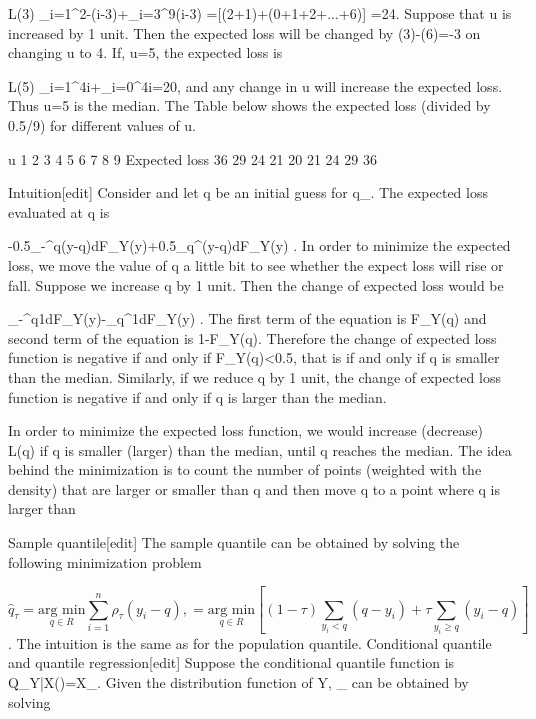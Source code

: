 L(3) \propto\sum_{i=1}^{2}-(i-3)+\sum_{i=3}^{9}(i-3) =[(2+1)+(0+1+2+...+6)] =24.
Suppose that u is increased by 1 unit. Then the expected loss will be changed by (3)-(6)=-3 on changing u to 4. If, u=5, the expected loss is

L(5) \propto \sum_{i=1}^{4}i+\sum_{i=0}^{4}i=20,
and any change in u will increase the expected loss. Thus u=5 is the median. The Table below shows the expected loss (divided by {0.5/9}) for different values of u.

u	1	2	3	4	5	6	7	8	9
Expected loss	36	29	24	21	20	21	24	29	36

Intuition[edit]
Consider  and let q be an initial guess for q_{\tau}. The expected loss evaluated at q is

-0.5\int_{-\infty}^{q}(y-q)dF_{Y}(y)+0.5\int_{q}^{\infty}(y-q)dF_{Y}(y) .
In order to minimize the expected loss, we move the value of q a little bit to see whether the expect loss will rise or fall. Suppose we increase q by 1 unit. Then the change of expected loss would be

\int_{-\infty}^{q}1dF_{Y}(y)-\int_{q}^{\infty}1dF_{Y}(y) .
The first term of the equation is F_{Y}(q) and second term of the equation is 1-F_{Y}(q). Therefore the change of expected loss function is negative if and only if F_{Y}(q)<0.5, that is if and only if q is smaller than the median. Similarly, if we reduce q by 1 unit, the change of expected loss function is negative if and only if q is larger than the median.

In order to minimize the expected loss function, we would increase (decrease) L(q) if q is smaller (larger) than the median, until q reaches the median. The idea behind the minimization is to count the number of points (weighted with the density) that are larger or smaller than q and then move q to a point where q is larger than \tau%

Sample quantile[edit]
The \tau sample quantile can be obtained by solving the following minimization problem

\[\hat{q}_{\tau}=\underset{q\in R}{\mbox{arg min}}\sum_{i=1}^{n}\rho_{\tau}(y_{i}-q) ,
=\underset{q\in R}{\mbox{arg min}}  \left[(1 - \tau)\sum_{y_{i}<q}(q - y_{i})+\tau\sum_{y_{i}\geq q}(y_{i}-q) \right]\]. The intuition is the same as for the population quantile.
Conditional quantile and quantile regression[edit]
Suppose the \tauth conditional quantile function is  Q_{Y|X}(\tau)=X\beta_{\tau}. Given the distribution function of Y, \beta_{\tau} can be obtained by solving

